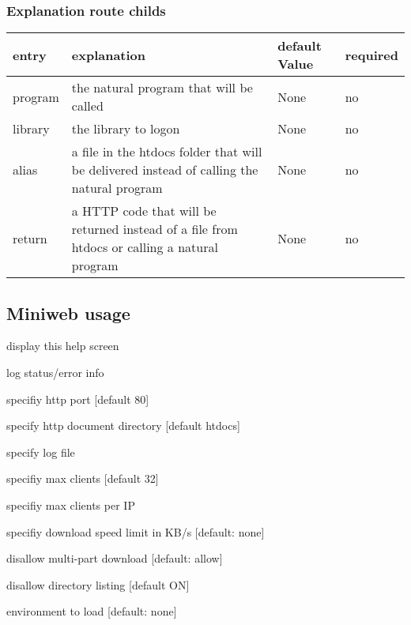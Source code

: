 \documentclass[letterpaper,10pt,english]{sphinxmanual}
\begin{document}
\subsubsection{Explanation route childs}
\label{webserver:explanation-route-childs}
\noindent\begin{tabulary}{\linewidth}{|L|L|L|L|}
\hline
\textsf{\relax 
entry
\unskip}\relax &\textsf{\relax 
explanation
\unskip}\relax &\textsf{\relax 
default Value
\unskip}\relax &\textsf{\relax 
required
\unskip}\relax \\
\hline
program
&
the natural program that will be called
&
None
&
no
\\
\hline
library
&
the library to logon
&
None
&
no
\\
\hline
alias
&
a file in the htdocs folder that will be delivered instead of calling the natural program
&
None
&
no
\\
\hline
return
&
a HTTP code that will be returned instead of a file from htdocs or calling a natural program
&
None
&
no
\\
\hline\end{tabulary}



\subsection{Miniweb usage}
\label{webserver:miniweb-usage}\begin{optionlist}{3cm}
\item [-h]  
display this help screen
\item [-v]  
log status/error info
\item [-p]  
specifiy http port {[}default 80{]}
\item [-r]  
specify http document directory {[}default htdocs{]}
\item [-l]  
specify log file
\item [-m]  
specifiy max clients {[}default 32{]}
\item [-M]  
specifiy max clients per IP
\item [-s]  
specifiy download speed limit in KB/s {[}default: none{]}
\item [-n]  
disallow multi-part download {[}default: allow{]}
\item [-d]  
disallow directory listing {[}default ON{]}
\item [-{-}environment]  
environment to load {[}default: none{]}
\end{optionlist}
\end{document}
